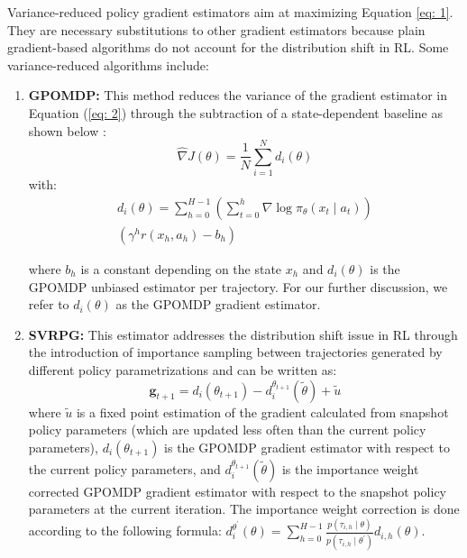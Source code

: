 \documentclass[10pt,twocolumn,letterpaper]{article}
\begin{document}
Variance-reduced policy gradient estimators aim at maximizing Equation \ref{eq: 1}. They are necessary substitutions to other gradient estimators because plain gradient-based algorithms do not account for the distribution shift in RL. Some variance-reduced algorithms include: 

\begin{enumerate}
    \item \textbf{GPOMDP:} This method reduces the variance of the gradient estimator in Equation (\ref{eq: 2}) through the subtraction of a state-dependent baseline as shown below \cite{gpomdp}:
    \begin{equation}
    \hat{\nabla} J(\theta)=\frac{1}{N} \sum_{i=1}^{N} d_{i}(\theta)
    \end{equation}
with: 
\begin{multline} \label{eq: 5}
d_{i}(\theta)=\sum_{h=0}^{H-1}\left(\sum_{t=0}^{h} \nabla \log \pi_{\theta}\left(x_{t} \mid a_{t}\right)\right)\\\left(\gamma^{h} r\left(x_{h}, a_{h}\right)-b_{h}\right)
\end{multline}

   where $b_{h}$ is a constant depending on the state $x_{h}$ and $d_{i}(\theta)$ is the GPOMDP unbiased estimator per trajectory. For our further discussion, we refer to $d_{i}(\theta)$ as the GPOMDP gradient estimator. 

    \item \textbf{SVRPG:} This estimator addresses the distribution shift issue in RL through the introduction of importance sampling between trajectories generated by different policy parametrizations \cite{RN17} and can be written as:
    \begin{equation} \label{eq: 6}
    \mathbf{g}_{t+1}=d_{i}\left(\theta_{t+1}\right)-d_{i}^{\theta_{t+1}}(\tilde{\theta})+\tilde{u}
    \end{equation}
    where $\tilde{u}$ is a fixed point estimation of the gradient calculated from snapshot policy parameters (which are updated less often than the current policy parameters), $d_{i}\left(\theta_{t+1}\right)$ is the GPOMDP gradient estimator with respect to the current policy parameters, and $d_{i}^{\theta_{t+1}}(\tilde{\theta})$ is the importance weight corrected GPOMDP gradient estimator with respect to the snapshot policy parameters at the current iteration. The importance weight correction is done according to the following formula:
    $d_{i}^{\theta^{\prime}}(\theta)=\sum_{h=0}^{H-1} \frac{p\left(\tau_{i, h} \mid \theta\right)}{p\left(\tau_{i, h} \mid \theta^{\prime}\right)} d_{i, h}(\theta)$.
    

\end{enumerate}
\end{document}
